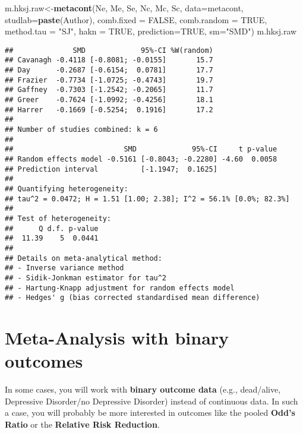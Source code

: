 \documentclass[]{book}
\newenvironment{Shaded}{\begin{snugshade}}{\end{snugshade}}
\newcommand{\KeywordTok}[1]{\textcolor[rgb]{0.13,0.29,0.53}{\textbf{#1}}}
\newcommand{\DataTypeTok}[1]{\textcolor[rgb]{0.13,0.29,0.53}{#1}}
\newcommand{\StringTok}[1]{\textcolor[rgb]{0.31,0.60,0.02}{#1}}
\newcommand{\OtherTok}[1]{\textcolor[rgb]{0.56,0.35,0.01}{#1}}
\newcommand{\NormalTok}[1]{#1}
\theoremstyle{definition}
\theoremstyle{definition}
\theoremstyle{definition}
\theoremstyle{remark}
\begin{document}
\begin{Shaded}
\begin{Highlighting}[]
\NormalTok{m.hksj.raw<-}\KeywordTok{metacont}\NormalTok{(Ne,}
\NormalTok{        Me,}
\NormalTok{        Se,}
\NormalTok{        Nc,}
\NormalTok{        Mc,}
\NormalTok{        Sc,}
        \DataTypeTok{data=}\NormalTok{metacont,}
        \DataTypeTok{studlab=}\KeywordTok{paste}\NormalTok{(Author),}
        \DataTypeTok{comb.fixed =} \OtherTok{FALSE}\NormalTok{,}
        \DataTypeTok{comb.random =} \OtherTok{TRUE}\NormalTok{,}
        \DataTypeTok{method.tau =} \StringTok{"SJ"}\NormalTok{,}
        \DataTypeTok{hakn =} \OtherTok{TRUE}\NormalTok{,}
        \DataTypeTok{prediction=}\OtherTok{TRUE}\NormalTok{,}
        \DataTypeTok{sm=}\StringTok{"SMD"}\NormalTok{)}
\NormalTok{m.hksj.raw}
\end{Highlighting}
\end{Shaded}

\begin{verbatim}
##              SMD             95%-CI %W(random)
## Cavanagh -0.4118 [-0.8081; -0.0155]       15.7
## Day      -0.2687 [-0.6154;  0.0781]       17.7
## Frazier  -0.7734 [-1.0725; -0.4743]       19.7
## Gaffney  -0.7303 [-1.2542; -0.2065]       11.7
## Greer    -0.7624 [-1.0992; -0.4256]       18.1
## Harrer   -0.1669 [-0.5254;  0.1916]       17.2
## 
## Number of studies combined: k = 6
## 
##                          SMD             95%-CI     t p-value
## Random effects model -0.5161 [-0.8043; -0.2280] -4.60  0.0058
## Prediction interval          [-1.1947;  0.1625]              
## 
## Quantifying heterogeneity:
## tau^2 = 0.0472; H = 1.51 [1.00; 2.38]; I^2 = 56.1% [0.0%; 82.3%]
## 
## Test of heterogeneity:
##      Q d.f. p-value
##  11.39    5  0.0441
## 
## Details on meta-analytical method:
## - Inverse variance method
## - Sidik-Jonkman estimator for tau^2
## - Hartung-Knapp adjustment for random effects model
## - Hedges' g (bias corrected standardised mean difference)
\end{verbatim}

\section{Meta-Analysis with binary outcomes}\label{binary}

In some cases, you will work with \textbf{binary outcome data} (e.g.,
dead/alive, Depressive Disorder/no Depressive Disorder) instead of
continuous data. In such a case, you will probably be more interested in
outcomes like the pooled \textbf{Odd's Ratio} or the \textbf{Relative
Risk Reduction}.
\end{document}
